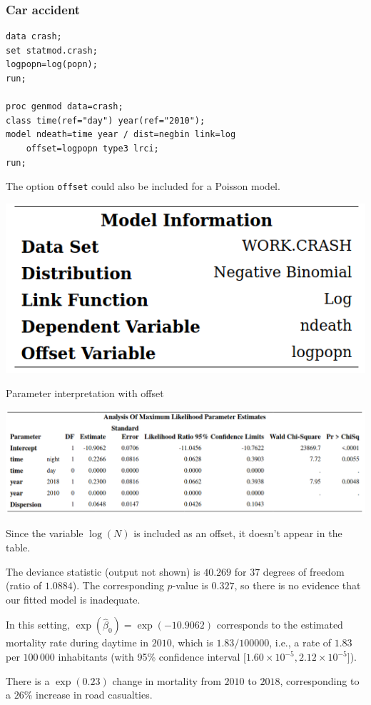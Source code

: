 \documentclass{beamer}
\begin{document}
\begin{frame}[fragile]
\frametitle{Car accident}

\begin{tcolorbox}[colback=white, colframe=hecblue, title=\SASlang{} code to include an offset term]
{\small
\begin{verbatim}
data crash;
set statmod.crash;
logpopn=log(popn);
run;

proc genmod data=crash;
class time(ref="day") year(ref="2010");
model ndeath=time year / dist=negbin link=log 
    offset=logpopn type3 lrci;
run;
\end{verbatim}
}
\end{tcolorbox}
{\footnotesize 

The option \texttt{offset} could also be included for a Poisson model.



}
\begin{center}
 \includegraphics[width = 0.4\linewidth]{img/c4/slides8-e9}
\end{center}

\end{frame}
\begin{frame}{Parameter interpretation with offset}
\begin{center}
 \includegraphics[width = 0.99\linewidth]{img/c4/slides8-e10}
\end{center}
{\small 
\bi \item Since the variable $\log(N)$ is included as an offset, it doesn't appear in the table.
\item The deviance statistic (output not shown) is $40.269$ for $37$ degrees of freedom (ratio of $1.0884$). The corresponding $p$-value is $0.327$, so there is no evidence that our fitted model is inadequate.
\item In this setting, $\exp(\hat{\beta}_0)=\exp(-10.9062)$ corresponds to the estimated mortality rate during daytime in $2010$, which is $1.83/100000$, i.e., a rate of $1.83$ per $100\,000$ inhabitants (with 95\% confidence interval [$1.60  \times 10^{-5}, 2.12 \times 10^{-5}]$).
\item There is a $\exp(0.23)$ change in mortality from $2010$ to $2018$, corresponding to a $26$\% increase in road casualties.
\ei
}
\end{frame}
\end{document}
